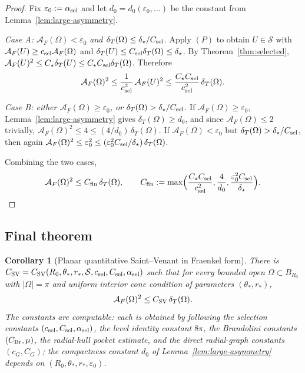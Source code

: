 \documentclass[11pt]{amsart}
\newtheorem{corollary}[theorem]{Corollary}
\newcommand{\dT}{\delta_T}
\newcommand{\AF}{\mathcal A_F}
\newcommand{\eps}{\varepsilon}
\newcommand{\Sclass}{\mathcal S}
\begin{document}
\begin{proof}
Fix \(\eps_0:=\alpha_{\rm sel}\) and let \(d_0=d_0(\eps_0,\ldots)\) be
the constant from Lemma~\ref{lem:large-asymmetry}.

\emph{Case A: \(\AF(\Omega)<\eps_0\) and
\(\dT(\Omega)\le\delta_\star/C_{\rm sel}\).}  Apply \((P)\) to obtain
\(U\in\Sclass\) with \(\AF(U)\ge c_{\rm sel}\AF(\Omega)\) and
\(\dT(U)\le C_{\rm sel}\dT(\Omega)\le\delta_\star\).  By
Theorem~\ref{thm:selected},
\(\AF(U)^2\le C_\star\dT(U)\le C_\star C_{\rm sel}\dT(\Omega)\).
Therefore
\[
   \AF(\Omega)^2\le\frac{1}{c_{\rm sel}^2}\,\AF(U)^2
      \le\frac{C_\star C_{\rm sel}}{c_{\rm sel}^2}\,\dT(\Omega).
\]

\emph{Case B: either \(\AF(\Omega)\ge\eps_0\), or
\(\dT(\Omega)>\delta_\star/C_{\rm sel}\).}
If \(\AF(\Omega)\ge\eps_0\), Lemma~\ref{lem:large-asymmetry} gives
\(\dT(\Omega)\ge d_0\), and since \(\AF(\Omega)\le 2\) trivially,
\(\AF(\Omega)^2\le 4\le (4/d_0)\,\dT(\Omega)\).
If \(\AF(\Omega)<\eps_0\) but \(\dT(\Omega)>\delta_\star/C_{\rm sel}\),
then again
\(\AF(\Omega)^2\le\eps_0^2\le(\eps_0^2 C_{\rm sel}/\delta_\star)\,
\dT(\Omega)\).

Combining the two cases,
\[
   \AF(\Omega)^2\le C_{\rm fin}\,\dT(\Omega),
   \qquad
   C_{\rm fin}:=\max\Bigl(\frac{C_\star C_{\rm sel}}{c_{\rm sel}^2},
      \frac{4}{d_0},\frac{\eps_0^2 C_{\rm sel}}{\delta_\star}\Bigr).
\]
\end{proof}

\subsection{Final theorem}

\begin{corollary}[Planar quantitative Saint--Venant in Fraenkel form]
\label{cor:final-SV}
There is \(C_{\rm SV}=C_{\rm SV}(R_0,\theta_*,r_*,\Sclass,
c_{\rm sel},C_{\rm sel},\alpha_{\rm sel})\)
such that for every bounded open \(\Omega\subset B_{R_0}\) with
\(|\Omega|=\pi\) and uniform interior cone condition of parameters
\((\theta_*,r_*)\),
\begin{equation}\label{eq:final-SV}
   \AF(\Omega)^2\le C_{\rm SV}\,\dT(\Omega).
\end{equation}
The constants are computable: each is obtained by following the
selection constants \((c_{\rm sel},C_{\rm sel},\alpha_{\rm sel})\), the
level identity constant \(8\pi\), the Brandolini constants
\((C_{\rm Br},\mu)\), the radial-hull pocket estimate, and the direct
radial-graph constants \((c_G,C_G)\); the compactness constant \(d_0\)
of Lemma~\ref{lem:large-asymmetry} depends on
\((R_0,\theta_*,r_*,\eps_0)\).
\end{corollary}
\end{document}
